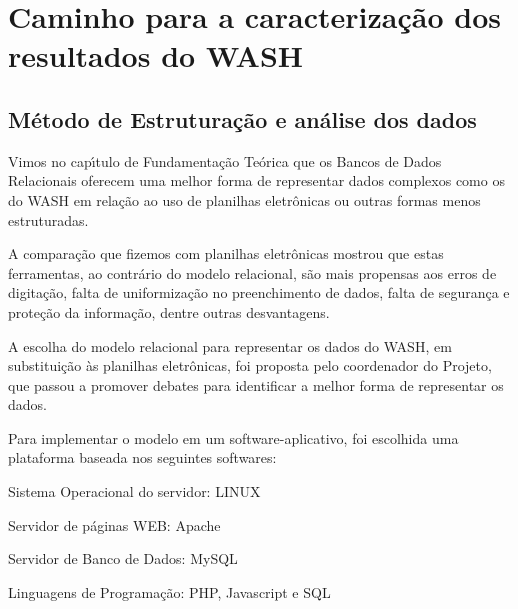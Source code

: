 \documentclass[
12pt,		%
openright,	%
twoside,  %
a4paper,			%
chapter=TITLE,		%
english,			%
french,				%
spanish,			%
brazil				%
]{USPSC-classe/USPSC_RedarTex}
\begin{document}
\section[Caminho para a caracteriza\c{c}\~ao dos resultados do WASH]{Caminho para a caracteriza\c{c}\~ao dos resultados do WASH}\label{Caminho para a caracteriza\c{c}\~ao dos resultados do WASH}
\subsection[M\'etodo de Estrutura\c{c}\~ao e an\'alise dos dados]{M\'etodo de Estrutura\c{c}\~ao e an\'alise dos dados}\label{M\'etodo de Estrutura\c{c}\~ao e an\'alise dos dados}
Vimos no cap\'{\i}tulo de Fundamenta\c{c}\~ao Te\'orica que os Bancos de Dados Relacionais oferecem uma melhor forma de representar dados complexos como os do WASH em rela\c{c}\~ao ao uso de planilhas eletr\^onicas ou outras formas menos estruturadas.










A compara\c{c}\~ao que fizemos com planilhas eletr\^onicas mostrou que estas ferramentas, ao contr\'ario do modelo relacional, s\~ao mais propensas aos erros de digita\c{c}\~ao, falta de uniformiza\c{c}\~ao no preenchimento de dados, falta de seguran\c{c}a e prote\c{c}\~ao da informa\c{c}\~ao, dentre outras desvantagens.










A escolha do modelo relacional para representar os dados do WASH, em substitui\c{c}\~ao \`as planilhas eletr\^onicas, foi proposta pelo coordenador do Projeto, que passou a promover debates para identificar a melhor forma de representar os dados.










Para implementar o modelo em um software-aplicativo, foi escolhida uma plataforma baseada nos seguintes softwares:











\begin{alineas}
\item Sistema Operacional do servidor: LINUX
\item Servidor de p\'aginas WEB: Apache
\item Servidor de Banco de Dados: MySQL
\item Linguagens de Programa\c{c}\~ao: PHP, Javascript e SQL
\end{alineas}
\end{document}
